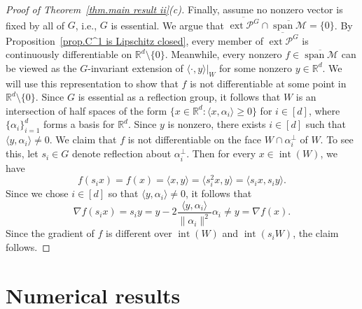 \documentclass{article}
\theoremstyle{plain}
\theoremstyle{definition}
\begin{document}
\begin{proof}[Proof of Theorem~\ref{thm.main result ii}(c)]
Finally, assume no nonzero vector is fixed by all of $G$, i.e., $G$ is essential.
We argue that $\overline{\operatorname{ext}\mathcal{P}^G}\cap\overline{\operatorname{span}\mathcal{M}}=\{0\}$.
By Proposition~\ref{prop.C^1 is Lipschitz closed}, every member of $\overline{\operatorname{ext}\mathcal{P}^G}$ is continuously differentiable on $\mathbb{R}^d\setminus\{0\}$.
Meanwhile, every nonzero $f\in\overline{\operatorname{span}\mathcal{M}}$ can be viewed as the $G$-invariant extension of $\langle\cdot,y\rangle|_W$ for some nonzero $y\in\mathbb{R}^d$.
We will use this representation to show that $f$ is not differentiable at some point in $\mathbb{R}^d\setminus\{0\}$.
Since $G$ is essential as a reflection group, it follows that $W$ is an intersection of half spaces of the form $\{x\in\mathbb{R}^d:\langle x,\alpha_i\rangle\geq0\}$ for $i\in[d]$, where $\{\alpha_i\}_{i=1}^d$ forms a basis for $\mathbb{R}^d$.
Since $y$ is nonzero, there exists $i\in[d]$ such that $\langle y,\alpha_i\rangle\neq0$.
We claim that $f$ is not differentiable on the face $W\cap \alpha_i^\perp$ of $W$.
To see this, let $s_i\in G$ denote reflection about $\alpha_i^\perp$.
Then for every $x\in \operatorname{int}(W)$, we have
\[
f(s_ix)
=f(x)
=\langle x,y\rangle
=\langle s_i^2x,y\rangle
=\langle s_ix,s_iy\rangle.
\]
Since we chose $i\in[d]$ so that $\langle y,\alpha_i\rangle\neq 0$, it follows that 
\[
\nabla f(s_ix)
=s_iy 
= y-2\frac{\langle y,\alpha_i\rangle}{\|\alpha_i\|^2}\alpha_i
\neq y
=\nabla f(x).
\]
Since the gradient of $f$ is different over $\operatorname{int}(W)$ and $\operatorname{int}(s_iW)$, the claim follows.
\end{proof}

\section{Numerical results}
\label{sec.numerical}
\end{document}
